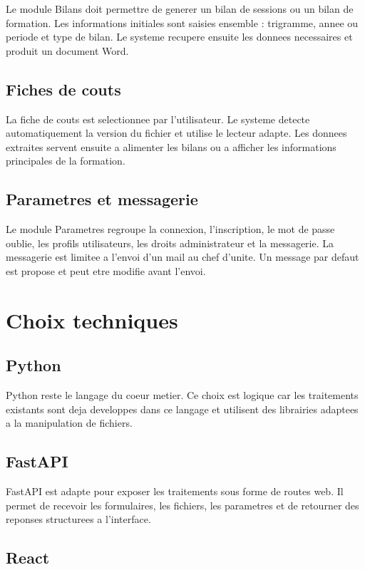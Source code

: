 \documentclass[11pt,a4paper]{report}
\begin{document}
Le module Bilans doit permettre de generer un bilan de sessions ou un bilan de formation. Les informations initiales sont saisies ensemble : trigramme, annee ou periode et type de bilan. Le systeme recupere ensuite les donnees necessaires et produit un document Word.

\section{Fiches de couts}

La fiche de couts est selectionnee par l'utilisateur. Le systeme detecte automatiquement la version du fichier et utilise le lecteur adapte. Les donnees extraites servent ensuite a alimenter les bilans ou a afficher les informations principales de la formation.

\section{Parametres et messagerie}

Le module Parametres regroupe la connexion, l'inscription, le mot de passe oublie, les profils utilisateurs, les droits administrateur et la messagerie. La messagerie est limitee a l'envoi d'un mail au chef d'unite. Un message par defaut est propose et peut etre modifie avant l'envoi.

\chapter{Choix techniques}

\section{Python}

Python reste le langage du coeur metier. Ce choix est logique car les traitements existants sont deja developpes dans ce langage et utilisent des librairies adaptees a la manipulation de fichiers.

\section{FastAPI}

FastAPI est adapte pour exposer les traitements sous forme de routes web. Il permet de recevoir les formulaires, les fichiers, les parametres et de retourner des reponses structurees a l'interface.

\section{React}
\end{document}
